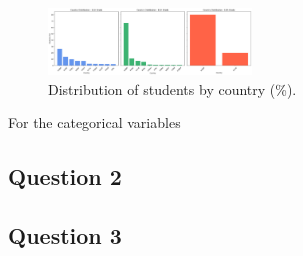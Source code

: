 \begin{figure}
    \centering
    \includegraphics[width=0.48\textwidth]{figures/Q1_CountryDistri.png}
    \caption{Distribution of students by country (\%).}
    \label{fig:country_distribution}
\end{figure}

For the categorical variables


\subsection{Question 2}

\subsection{Question 3}